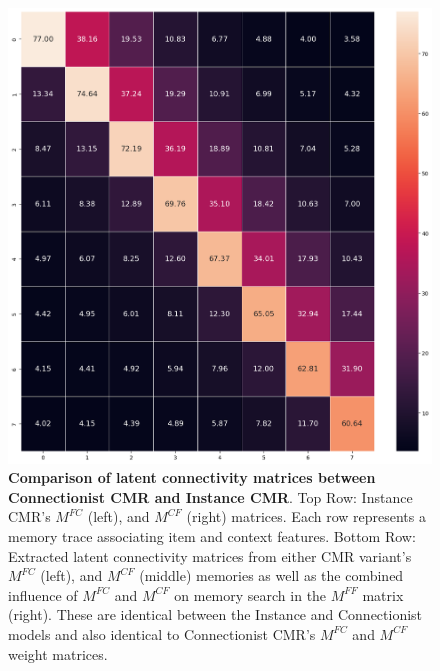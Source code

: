 \documentclass[
  letterpaper,
  11pt,
  english,
  singlespacing,
  headsepline]{MastersDoctoralThesis}
\begin{document}
\begin{figure}
%
\begin{minipage}{0.33\linewidth}
\includegraphics{icmr_figures/latent_mff.png}\end{minipage}%

\caption{\label{fig-matrix}\textbf{Comparison of latent connectivity
matrices between Connectionist CMR and Instance CMR}. Top Row: Instance
CMR's \(M^{FC}\) (left), and \(M^{CF}\) (right) matrices. Each row
represents a memory trace associating item and context features. Bottom
Row: Extracted latent connectivity matrices from either CMR variant's
\(M^{FC}\) (left), and \(M^{CF}\) (middle) memories as well as the
combined influence of \(M^{FC}\) and \(M^{CF}\) on memory search in the
\(M^{FF}\) matrix (right). These are identical between the Instance and
Connectionist models and also identical to Connectionist CMR's
\(M^{FC}\) and \(M^{CF}\) weight matrices.}

\end{figure}%
\end{document}

